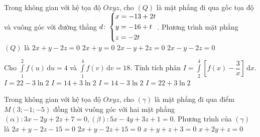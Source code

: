\begin{ex}%
	Trong không gian với hệ tọa độ $Oxyz$, cho $(Q)$ là mặt phẳng đi qua gốc tọa độ và vuông góc với đường thẳng $d\colon \left\{\begin{aligned}  & x= - 13 + 2t \\   & y= - 16 + t \\ 
	& z= - 2t \end{aligned}\right. $. Phương trình mặt phẳng $(Q)$ là
	\choice
	{\True $2x + y - 2z=0$}
	{$2x + y=0$}
	{$2x - y + 2z=0$}
	{$2x - y - 2z=0$}
\end{ex}
\begin{ex}%
	Cho $\displaystyle\int\limits_1^2{f(u)\mathrm{\,d}u=4}$ và $\displaystyle\int\limits_1^4{f(v)\mathrm{\,d}v}=18$. Tính tích phân $I=\displaystyle\int\limits_2^4{\left[f(x) - \dfrac{3}{x}\right]}\mathrm{\,d}x$. 
	\choice
	{$I=22 - 3\ln 2$}
	{$I=14 + 3\ln 2$}
	{\True $I=14 - 3\ln 2$}
	{$I=22 + 3\ln 2$}
\end{ex}
\begin{ex}%
	Trong không gian với hệ tọa độ $Oxyz$, cho $\left(\gamma\right)$ là mặt phẳng đi qua điểm $M\left(3; - 1; - 5\right)$ đồng thời vuông góc với hai mặt phẳng $\left(\alpha\right)\colon 3x - 2y + 2z + 7=0, \left(\beta\right)\colon 5x - 4y + 3z + 1=0$. Phương trình của $\left(\gamma\right)$ là 
	\choice
	{\True $2x + y - 2z - 15=0$}
	{$2x + y - 2z + 15=0$}
	{$x + y + z + 3=0$}
	{$x + 2y + z=0$}
\end{ex}

